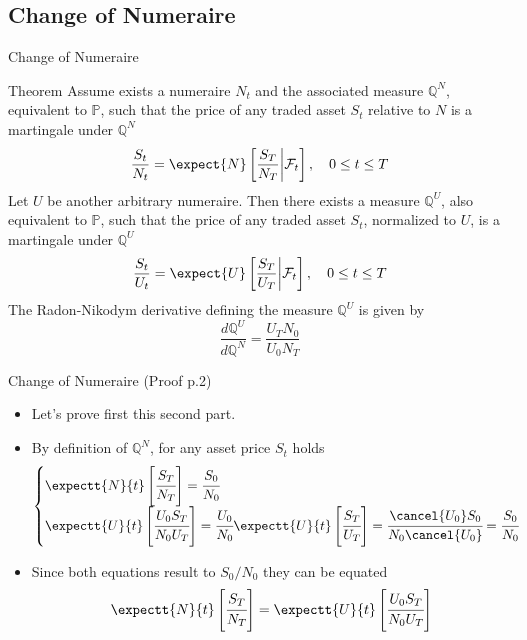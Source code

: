 \documentclass{beamer}
\begin{document}
\subsection{Change of Numeraire}
\begin{frame}{Change of Numeraire}
  \begin{block}{Theorem}
  	\small{
    Assume exists a numeraire $N_t$ and the associated measure $\mathbb{Q}^N$, equivalent to $\mathbb{P}$, such that the price of any traded asset $S_t$ relative to $N$ is a martingale under $\mathbb{Q}^N$
    \begin{equation*}
      \frac{S_t}{N_t} = \expect{N}\left[\frac{S_T}{N_T}\bigg|\mathcal{F}_t\right],\quad 0\le t \le T
    \end{equation*}
    Let $U$ be another arbitrary numeraire. Then there exists a measure $\mathbb{Q}^U$, also equivalent to $\mathbb{P}$, such that the price of any traded asset $S_t$, normalized to $U$, is a martingale under $\mathbb{Q}^U$
    \begin{equation*}
      \frac{S_t}{U_t} = \expect{U}\left[\frac{S_T}{U_T}\bigg|\mathcal{F}_t\right],\quad 0\le t \le T
    \end{equation*}
    The Radon-Nikodym derivative defining the measure $\mathbb{Q}^U$ is given by
\begin{equation}
	\frac{d\mathbb{Q}^U}{d\mathbb{Q}^N} = \frac{U_T N_0}{U_0 N_T}
	\label{eq:radon_nikodym_der2}
\end{equation}}
  \end{block}
\end{frame}	

\begin{frame}{Change of Numeraire (Proof p.2)}
	\begin{itemize}
		\item Let's prove first this second part.
  		\item By definition of $\mathbb{Q}^N$, for any asset price $S_t$ holds
	  \begin{equation*}
	    \begin{cases} 
	      \expectt{N}{t}\left[\cfrac{S_T}{N_T}\right] = \cfrac{S_0}{N_0} \\
\expectt{U}{t}\left[\cfrac{U_0 S_T}{N_0 U_T}\right] = \cfrac{U_0}{N_0}\expectt{U}{t}\left[\cfrac{S_T}{U_T}\right] = \cfrac{\cancel{U_0} S_0}{N_0 \cancel{U_0}} = \cfrac{S_0}{N_0}
	    \end{cases}
	  \end{equation*}
  	\item Since both equations result to $S_0/N_0$ they can be equated
  	\begin{equation*}
  	\expectt{N}{t}\left[\cfrac{S_T}{N_T}\right] = \expectt{U}{t}\left[\cfrac{U_0 S_T}{N_0 U_T}\right]
  	\end{equation*}
  	\end{itemize} 
\end{frame}
\end{document}
